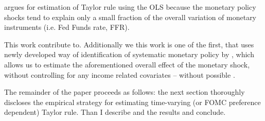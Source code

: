 \documentclass[11pt]{article}
\begin{document}
\citet{Carvalho2021} argues for estimation of Taylor rule using the OLS because the monetary policy shocks tend to explain only a small fraction of the overall variation of monetary instruments (i.e. Fed Funds rate, FFR).

\citet{Aguiar2018}



This work contribute to. Additionally we this work is one of the first, that uses newly developed way of identification of systematic monetary policy  by , which allows us to estimate the aforementioned overall effect of the monetary shock, without controlling for any income related covariates -- without possible .



The remainder of the paper proceeds as follows: 
the next section thoroughly discloses the empirical strategy for estimating time-varying (or FOMC preference dependent) Taylor rule.
Than I describe and the results and conclude.
\end{document}
